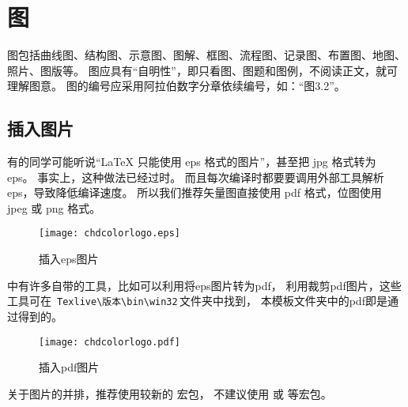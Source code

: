 \section{图}
图包括曲线图、结构图、示意图、图解、框图、流程图、记录图、布置图、地图、照片、图版等。
图应具有“自明性”，即只看图、图题和图例，不阅读正文，就可理解图意。
图的编号应采用阿拉伯数字分章依续编号，如：“图3.2”。

\subsection{插入图片}
有的同学可能听说“\LaTeX{} 只能使用 eps 格式的图片”，甚至把 jpg 格式转为 eps。
事实上，这种做法已经过时。
而且每次编译时都要要调用外部工具解析 eps，导致降低编译速度。
所以我们推荐矢量图直接使用 pdf 格式，位图使用 jpeg 或 png 格式。
\begin{figure}[htb]
  \centering
  \texttt{[image: chdcolorlogo.eps]}
  \caption{插入eps图片}
  \label{fig:logo}
\end{figure}

中有许多自带的工具，比如可以利用将eps图片转为pdf，
利用裁剪pdf图片，这些工具可在
\,\verb|Texlive|\verb|\版本|\verb|\bin|\verb|\win32|\,文件夹中找到，
本模板文件夹中的pdf即是通过得到的。
\begin{figure}[htb]
  \centering
  \texttt{[image: chdcolorlogo.pdf]}
  \caption{插入pdf图片}
  \label{fig:logo}
\end{figure}

关于图片的并排，推荐使用较新的  宏包，
不建议使用  或  等宏包。
